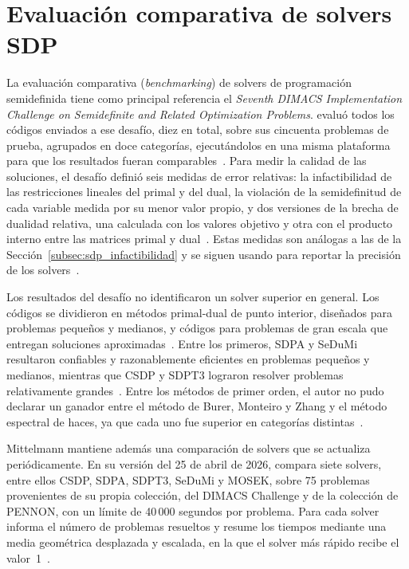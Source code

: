 \section{Evaluación comparativa de solvers SDP}
\label{sec:benchmarking_sdp}

La evaluación comparativa (\textit{benchmarking}) de solvers de programación semidefinida tiene
como principal referencia el \textit{Seventh DIMACS Implementation Challenge on Semidefinite and
Related Optimization Problems}. \textcite{mittelmannIndependentBenchmarkingSDP2003a} evaluó todos
los códigos enviados a ese desafío, diez en total, sobre sus cincuenta problemas de prueba,
agrupados en doce categorías, ejecutándolos en una misma plataforma para que los resultados fueran
comparables~\parencite[pp.~407 y 410]{mittelmannIndependentBenchmarkingSDP2003a}. Para medir la
calidad de las soluciones, el desafío definió seis medidas de error relativas: la infactibilidad
de las restricciones lineales del primal y del dual, la violación de la semidefinitud de cada
variable medida por su menor valor propio, y dos versiones de la brecha de dualidad relativa,
una calculada con los valores objetivo y otra con el producto interno entre las matrices primal
y dual~\parencite[p.~409]{mittelmannIndependentBenchmarkingSDP2003a}. Estas medidas son análogas
a las de la Sección~\ref{subsec:sdp_infactibilidad} y se siguen usando para reportar la
precisión de los solvers~\parencite{PlatoasueduFtpSparse_sdphtml}.

Los resultados del desafío no identificaron un solver superior en general. Los códigos se
dividieron en métodos primal-dual de punto interior, diseñados para problemas pequeños y
medianos, y códigos para problemas de gran escala que entregan soluciones
aproximadas~\parencite[p.~410]{mittelmannIndependentBenchmarkingSDP2003a}. Entre los primeros,
SDPA y SeDuMi resultaron confiables y razonablemente eficientes en problemas pequeños y medianos,
mientras que CSDP y SDPT3 lograron resolver problemas relativamente
grandes~\parencite[p.~422]{mittelmannIndependentBenchmarkingSDP2003a}. Entre los métodos de primer
orden, el autor no pudo declarar un ganador entre el método de Burer, Monteiro y Zhang y el
método espectral de haces, ya que cada uno fue superior en categorías
distintas~\parencite[pp.~420--421]{mittelmannIndependentBenchmarkingSDP2003a}.

Mittelmann mantiene además una comparación de solvers que se actualiza periódicamente. En su
versión del 25 de abril de 2026, compara siete solvers, entre ellos CSDP, SDPA, SDPT3, SeDuMi y
MOSEK, sobre 75 problemas provenientes de su propia colección, del DIMACS Challenge y de la
colección de PENNON, con un límite de 40\,000 segundos por problema. Para cada solver informa el
número de problemas resueltos y resume los tiempos mediante una media geométrica desplazada y
escalada, en la que el solver más rápido recibe el valor~1~\parencite{PlatoasueduFtpSparse_sdphtml}.

